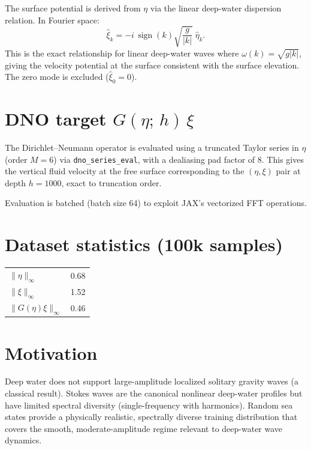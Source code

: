 \documentclass[11pt]{article}
\begin{document}
The surface potential is derived from $\eta$ via the linear deep-water dispersion relation. In Fourier space:
\begin{equation}
    \hat{\xi}_k = -i\, \operatorname{sign}(k) \sqrt{\frac{g}{|k|}}\; \hat{\eta}_k.
\end{equation}
This is the exact relationship for linear deep-water waves where $\omega(k) = \sqrt{g|k|}$, giving the velocity potential at the surface consistent with the surface elevation. The zero mode is excluded ($\hat{\xi}_0 = 0$).

\section{DNO target $G(\eta;\, h)\,\xi$}

The Dirichlet--Neumann operator is evaluated using a truncated Taylor series in $\eta$ (order $M = 6$) via \texttt{dno\_series\_eval}, with a dealiasing pad factor of 8. This gives the vertical fluid velocity at the free surface corresponding to the $(\eta, \xi)$ pair at depth $h = 1000$, exact to truncation order.

Evaluation is batched (batch size 64) to exploit JAX's vectorized FFT operations.

\section{Dataset statistics (100k samples)}

\begin{center}
\begin{tabular}{ll}
    $\|\eta\|_\infty$ & 0.68 \\
    $\|\xi\|_\infty$ & 1.52 \\
    $\|G(\eta)\xi\|_\infty$ & 0.46
\end{tabular}
\end{center}

\section{Motivation}

Deep water does not support large-amplitude localized solitary gravity waves (a classical result). Stokes waves are the canonical nonlinear deep-water profiles but have limited spectral diversity (single-frequency with harmonics). Random sea states provide a physically realistic, spectrally diverse training distribution that covers the smooth, moderate-amplitude regime relevant to deep-water wave dynamics.
\end{document}

